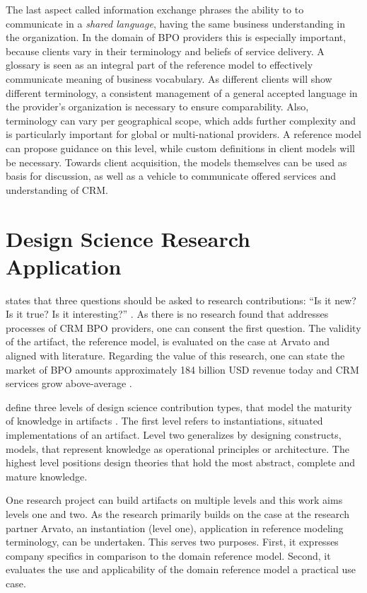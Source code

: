 The last aspect called information exchange phrases the ability to to communicate in a \textit{shared language}, \ie having the same business understanding in the organization. In the domain of BPO providers this is especially important, because clients vary in their terminology and beliefs of service delivery. A glossary is seen as an integral part of the reference model to effectively communicate meaning of business vocabulary. As different clients will show different terminology, a consistent management of a general accepted language in the provider’s organization is necessary to ensure comparability. Also, terminology can vary per geographical scope, which adds further complexity and is particularly important for global or multi-national providers. A reference model can propose guidance on this level, while custom definitions in client models will be necessary. Towards client acquisition, the models themselves can be used as basis for discussion, as well as a vehicle to communicate offered services and understanding of CRM.


%

\section{Design Science Research Application}

 \citeauthor{wilson2002responsible} states that three questions should be asked to research contributions: \enquote{Is it new? Is it true? Is it interesting?} \citep[]{wilson2002responsible}. As there is no research found that addresses processes of CRM BPO providers, one can consent the first question. The validity of the artifact, \viz the reference model, is evaluated on the case at Arvato and aligned with literature. Regarding the value of this research, one can state the market of BPO amounts approximately 184 billion USD revenue today and CRM services grow above-average \citep{hfs2016top}.  

\citeauthor{gregor2013positioning} define three levels of design science contribution types, that model the maturity of knowledge in artifacts \citep{gregor2013positioning}. The first level refers to instantiations, \ie situated implementations of an artifact. Level two generalizes by designing constructs, models, that represent knowledge as operational principles or architecture. The highest level positions design theories that hold the most abstract, complete and mature knowledge. 

One research project can build artifacts on multiple levels \citep{gregor2013positioning} and this work aims levels one and two. As the research primarily builds on the case at the research partner Arvato, an instantiation (level one), \viz application in reference modeling terminology, can be undertaken. This serves two purposes. First, it expresses company specifics in comparison to the domain reference model. Second, it evaluates the use and applicability of the domain reference model a practical use case.  

